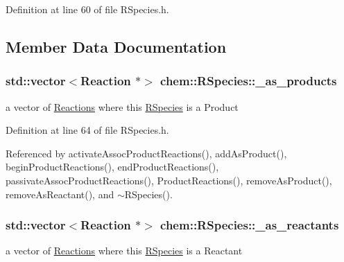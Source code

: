 Definition at line 60 of file R\-Species.\-h.



\subsection{Member Data Documentation}
\hypertarget{classchem_1_1RSpecies_a680c86be9b2ef8f87525291fabb15f11}{
\subsubsection[{\-\_\-as\-\_\-products}]{\setlength{\rightskip}{0pt plus 5cm}std\-::vector$<${\bf Reaction} $\ast$$>$ {\bf chem\-::\-R\-Species\-::\-\_\-as\-\_\-products}}}\label{classchem_1_1RSpecies_a680c86be9b2ef8f87525291fabb15f11}


a vector of \hyperlink{classchem_1_1Reaction}{Reactions} where this \hyperlink{classchem_1_1RSpecies}{R\-Species} is a Product 



Definition at line 64 of file R\-Species.\-h.



Referenced by activate\-Assoc\-Product\-Reactions(), add\-As\-Product(), begin\-Product\-Reactions(), end\-Product\-Reactions(), passivate\-Assoc\-Product\-Reactions(), Product\-Reactions(), remove\-As\-Product(), remove\-As\-Reactant(), and $\sim$\-R\-Species().

\hypertarget{classchem_1_1RSpecies_a3749fed57bf55e5677b4519b403598ba}{
\subsubsection[{\-\_\-as\-\_\-reactants}]{\setlength{\rightskip}{0pt plus 5cm}std\-::vector$<${\bf Reaction} $\ast$$>$ {\bf chem\-::\-R\-Species\-::\-\_\-as\-\_\-reactants}}}\label{classchem_1_1RSpecies_a3749fed57bf55e5677b4519b403598ba}


a vector of \hyperlink{classchem_1_1Reaction}{Reactions} where this \hyperlink{classchem_1_1RSpecies}{R\-Species} is a Reactant 



